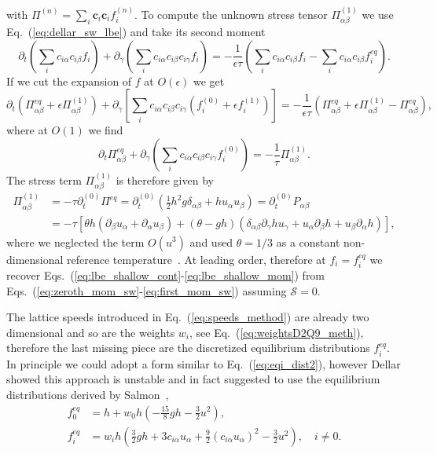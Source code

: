 with $\Pi^{(n)} = \sum_i \mathbf{c}_i\mathbf{c}_i f_i^{(n)}$.
To compute the unknown stress tensor $\Pi^{(1)}_{\alpha\beta}$ we use Eq.~(\ref{eq:dellar_sw_lbe}) and take its second moment
\begin{equation}
    \partial_t \left(\sum_i c_{i\alpha}c_{i\beta} f_i\right) + \partial_{\gamma}\left(\sum_i c_{i\alpha}c_{i\beta}c_{i\gamma} f_i\right) = -\frac{1}{\epsilon\tau}\left(\sum_i c_{i\alpha}c_{i\beta} f_i - \sum_ic_{i\alpha}c_{i\beta} f_i^{eq}\right).
\end{equation}
If we cut the expansion of $f$ at $O(\epsilon)$ we get
\begin{equation}
    \partial_t\left(\Pi^{eq}_{\alpha\beta} + \epsilon\Pi^{(1)}_{\alpha\beta}\right) + \partial_{\gamma}\left[\sum_i c_{i\alpha}c_{i\beta}c_{i\gamma} (f^{(0)}_i + \epsilon f^{(1)}_i)\right] = -\frac{1}{\epsilon\tau}\left(\Pi^{eq}_{\alpha\beta} + \epsilon\Pi^{(1)}_{\alpha\beta} - \Pi^{eq}_{\alpha\beta}\right),
\end{equation}
where at $O(1)$ we find
\begin{equation}
    \partial_t\Pi^{eq}_{\alpha\beta} + \partial_{\gamma}\left(\sum_i c_{i\alpha}c_{i\beta}c_{i\gamma} f^{(0)}_i\right) = -\frac{1}{\tau}\Pi^{(1)}_{\alpha\beta}.
\end{equation}
The stress term $\Pi_{\alpha\beta}^{(1)}$ is therefore given by
\begin{align}
    \Pi^{(1)}_{\alpha\beta} &= -\tau\partial_t^{(0)}\Pi^{eq} = \partial_t^{(0)}\left(\frac{1}{2}h^2 g\delta_{\alpha\beta} + h u_{\alpha}u_{\beta}\right) =  \partial_t^{(0)}P_{\alpha\beta} \\
     &= -\tau\left[\theta h(\partial_{\beta}u_{\alpha} + \partial_{\alpha}u_{\beta}) + \left(\theta - gh\right)(\delta_{\alpha\beta}\partial_{\gamma}h u_{\gamma} + u_{\alpha}\partial_{\beta}h + u_{\beta}\partial_{\alpha}h)\right],
\end{align}
where we neglected the term $O(u^3)$ and used $\theta = 1/3$ as a constant non-dimensional reference temperature~\cite{dellarNonhydrodynamicModesPriori2002}.
At leading order, therefore at $f_i = f_i^{eq}$ we recover Eqs.~(\ref{eq:lbe_shallow_cont}-\ref{eq:lbe_shallow_mom}) from Eqs.~(\ref{eq:zeroth_mom_sw}-\ref{eq:first_mom_sw}) assuming $\mathcal{S} = 0$.

The lattice speeds introduced in Eq.~(\ref{eq:speeds_method}) are already two dimensional and so are the weights $w_i$, see Eq.~(\ref{eq:weightsD2Q9_meth}), therefore the last missing piece are the discretized equilibrium distributions $f_i^{eq}$.
In principle we could adopt a form similar to Eq.~(\ref{eq:eqi_dist2}), however Dellar showed this approach is unstable and in fact suggested to use the equilibrium distributions derived by Salmon~\cite{dellarNonhydrodynamicModesPriori2002, salmonLatticeBoltzmannMethod1999},
\begin{align}
    f^{eq}_0 &= h + w_0h\left(-\frac{15}{8}gh - \frac{3}{2}u^2\right),\\
    f^{eq}_i &= w_i h\left(\frac{3}{2}gh + 3 c_{i\alpha}u_{\alpha} + \frac{9}{2}(c_{i\alpha}u_{\alpha})^2 - \frac{3}{2}u^2\right), \quad i\neq 0 .
\end{align}

